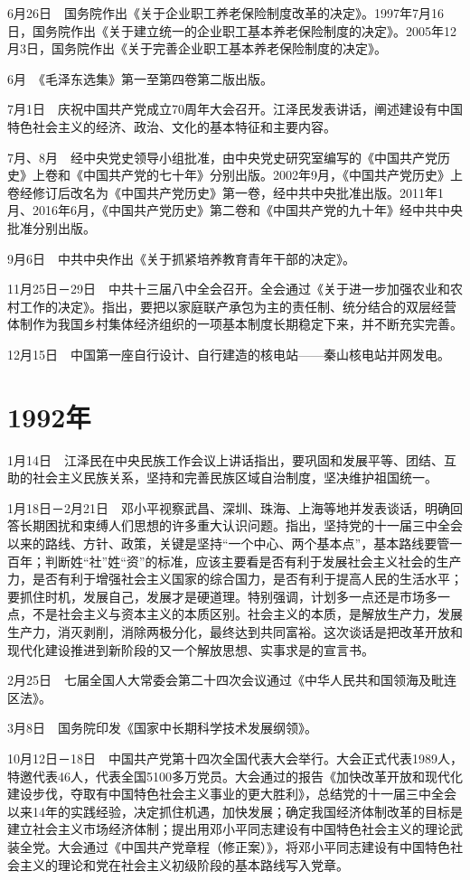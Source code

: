 \documentclass[10pt,a4paper,twocolumn]{book}
\begin{document}
6月26日　国务院作出《关于企业职工养老保险制度改革的决定》。1997年7月16日，国务院作出《关于建立统一的企业职工基本养老保险制度的决定》。2005年12月3日，国务院作出《关于完善企业职工基本养老保险制度的决定》。

6月　《毛泽东选集》第一至第四卷第二版出版。

7月1日　庆祝中国共产党成立70周年大会召开。江泽民发表讲话，阐述建设有中国特色社会主义的经济、政治、文化的基本特征和主要内容。

7月、8月　经中央党史领导小组批准，由中央党史研究室编写的《中国共产党历史》上卷和《中国共产党的七十年》分别出版。2002年9月，《中国共产党历史》上卷经修订后改名为《中国共产党历史》第一卷，经中共中央批准出版。2011年1月、2016年6月，《中国共产党历史》第二卷和《中国共产党的九十年》经中共中央批准分别出版。

9月6日　中共中央作出《关于抓紧培养教育青年干部的决定》。

11月25日－29日　中共十三届八中全会召开。全会通过《关于进一步加强农业和农村工作的决定》。指出，要把以家庭联产承包为主的责任制、统分结合的双层经营体制作为我国乡村集体经济组织的一项基本制度长期稳定下来，并不断充实完善。

12月15日　中国第一座自行设计、自行建造的核电站——秦山核电站并网发电。

\section{1992年}

1月14日　江泽民在中央民族工作会议上讲话指出，要巩固和发展平等、团结、互助的社会主义民族关系，坚持和完善民族区域自治制度，坚决维护祖国统一。

1月18日－2月21日　邓小平视察武昌、深圳、珠海、上海等地并发表谈话，明确回答长期困扰和束缚人们思想的许多重大认识问题。指出，坚持党的十一届三中全会以来的路线、方针、政策，关键是坚持“一个中心、两个基本点”，基本路线要管一百年；判断姓“社”姓“资”的标准，应该主要看是否有利于发展社会主义社会的生产力，是否有利于增强社会主义国家的综合国力，是否有利于提高人民的生活水平；要抓住时机，发展自己，发展才是硬道理。特别强调，计划多一点还是市场多一点，不是社会主义与资本主义的本质区别。社会主义的本质，是解放生产力，发展生产力，消灭剥削，消除两极分化，最终达到共同富裕。这次谈话是把改革开放和现代化建设推进到新阶段的又一个解放思想、实事求是的宣言书。

2月25日　七届全国人大常委会第二十四次会议通过《中华人民共和国领海及毗连区法》。

3月8日　国务院印发《国家中长期科学技术发展纲领》。

10月12日－18日　中国共产党第十四次全国代表大会举行。大会正式代表1989人，特邀代表46人，代表全国5100多万党员。大会通过的报告《加快改革开放和现代化建设步伐，夺取有中国特色社会主义事业的更大胜利》，总结党的十一届三中全会以来14年的实践经验，决定抓住机遇，加快发展；确定我国经济体制改革的目标是建立社会主义市场经济体制；提出用邓小平同志建设有中国特色社会主义的理论武装全党。大会通过《中国共产党章程（修正案）》，将邓小平同志建设有中国特色社会主义的理论和党在社会主义初级阶段的基本路线写入党章。
\end{document}

